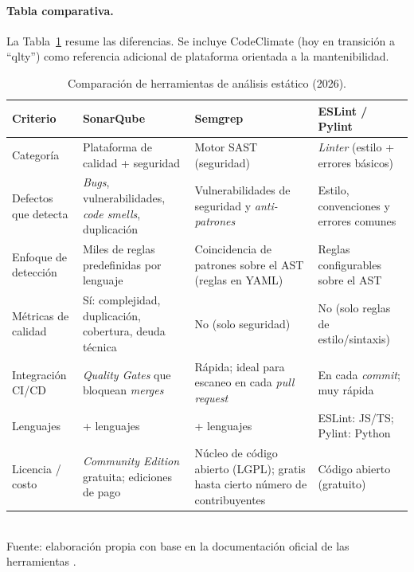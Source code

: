 \documentclass[12pt]{article}
\begin{document}
\paragraph{Tabla comparativa.}
La Tabla~\ref{tab:static} resume las diferencias. Se incluye CodeClimate (hoy en
transición a ``qlty'') como referencia adicional de plataforma orientada a la
mantenibilidad.

\begin{table}[htbp]
\centering
\footnotesize
\caption{Comparación de herramientas de análisis estático (2026).}
\label{tab:static}
\renewcommand{\arraystretch}{1.25}
\begin{tabularx}{\textwidth}{>{\RaggedRight\arraybackslash}p{}
                             >{\RaggedRight\arraybackslash}X
                             >{\RaggedRight\arraybackslash}X
                             >{\RaggedRight\arraybackslash}X}
\toprule
\textbf{Criterio} & \textbf{SonarQube} & \textbf{Semgrep} & \textbf{ESLint / Pylint} \\
\midrule
Categoría &
Plataforma de calidad + seguridad &
Motor SAST (seguridad) &
\textit{Linter} (estilo + errores básicos) \\

Defectos que detecta &
\textit{Bugs}, vulnerabilidades, \textit{code smells}, duplicación &
Vulnerabilidades de seguridad y \textit{anti-patrones} &
Estilo, convenciones y errores comunes \\

Enfoque de detección &
Miles de reglas predefinidas por lenguaje &
Coincidencia de patrones sobre el AST (reglas en YAML) &
Reglas configurables sobre el AST \\

Métricas de calidad &
Sí: complejidad, duplicación, cobertura, deuda técnica &
No (solo seguridad) &
No (solo reglas de estilo/sintaxis) \\

Integración CI/CD &
\textit{Quality Gates} que bloquean \textit{merges} &
Rápida; ideal para escaneo en cada \textit{pull request} &
En cada \textit{commit}; muy rápida \\

Lenguajes &
30+ lenguajes &
35+ lenguajes &
ESLint: JS/TS; Pylint: Python \\

Licencia / costo &
\textit{Community Edition} gratuita; ediciones de pago &
Núcleo de código abierto (LGPL); gratis hasta cierto número de contribuyentes &
Código abierto (gratuito) \\
\bottomrule
\end{tabularx}
\\[2pt]
{\footnotesize Fuente: elaboración propia con base en la documentación oficial de las
herramientas \citep{sonarqubedocs}.}
\end{table}
\end{document}
